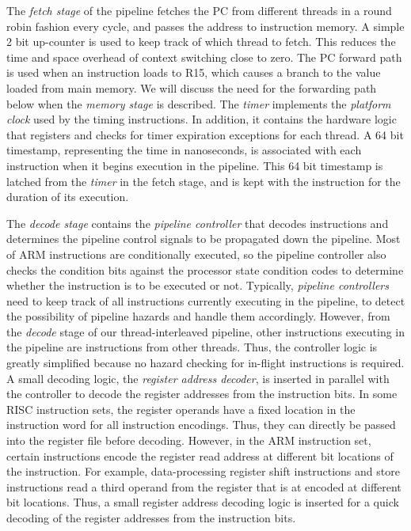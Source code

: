 The \emph{fetch stage} of the pipeline fetches the PC from different threads in a round robin fashion every cycle, and passes the address to instruction memory. 
A simple 2 bit up-counter is used to keep track of which thread to fetch.
This reduces the time and space overhead of context switching close to zero. 
The PC forward path is used when an instruction loads to R15, which causes a branch to the value loaded from main memory.  
We will discuss the need for the forwarding path below when the \emph{memory stage} is described.
The \emph{timer} implements the \emph{platform clock} used by the timing instructions.
In addition, it contains the hardware logic that registers and checks for timer expiration exceptions for each thread.
A 64 bit timestamp, representing the time in nanoseconds, is associated with each instruction when it begins execution in the pipeline.
This 64 bit timestamp is latched from the \emph{timer} in the fetch stage, and is kept with the instruction for the duration of its execution. 

The \emph{decode stage} contains the \emph{pipeline controller} that decodes instructions and determines the pipeline control signals to be propagated down the pipeline.
Most of ARM instructions are conditionally executed, so the pipeline controller also checks the condition bits against the processor state condition codes to determine whether the instruction is to be executed or not.  
Typically, \emph{pipeline controllers} need to keep track of all instructions currently executing in the pipeline, to detect the possibility of pipeline hazards and handle them accordingly.
However, from the \emph{decode} stage of our thread-interleaved pipeline, other instructions executing in the pipeline are instructions from other threads.
Thus, the controller logic is greatly simplified because no hazard checking for in-flight instructions is required.  
A small decoding logic, the \emph{register address decoder}, is inserted in parallel with the controller to decode the register addresses from the instruction bits.  
In some RISC instruction sets, the register operands have a fixed location in the instruction word for all instruction encodings.
Thus, they can directly be passed into the register file before decoding.   
However, in the ARM instruction set, certain instructions encode the register read address at different bit locations of the instruction.
For example, data-processing register shift instructions and store instructions read a third operand from the register that is at encoded at different bit locations.
Thus, a small register address decoding logic is inserted for a quick decoding of the register addresses from the instruction bits.


